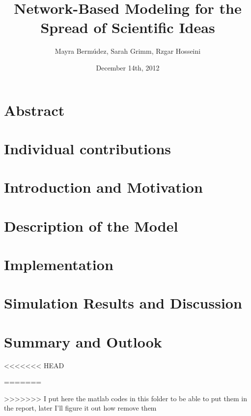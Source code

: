 \documentclass[11pt]{article}
\title{Network-Based Modeling for the Spread of Scientific Ideas}
\author{Mayra Berm\'udez, Sarah Grimm, Rzgar Hosseini}
\date{December 14th, 2012}
\begin{document}

\newpage



\newpage







\tableofcontents

\newpage




\section{Abstract}

\newpage

\section{Individual contributions}

\newpage

\section{Introduction and Motivation}

\newpage

\section{Description of the Model}

\newpage

\section{Implementation}

\newpage

\section{Simulation Results and Discussion}

\newpage

\section{Summary and Outlook}

\newpage


<<<<<<< HEAD

=======
\appendix




>>>>>>> I put here the matlab codes in this folder to be able to put them in the report, later I'll figure it out how remove them

\end{document}
